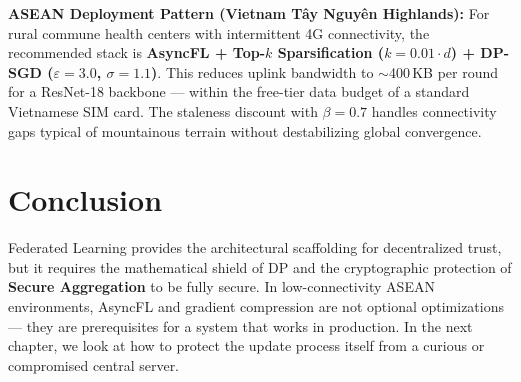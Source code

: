 \begin{svgraybox}
\textbf{ASEAN Deployment Pattern (Vietnam T\^ay Nguy\^en Highlands):} For rural commune health centers with intermittent 4G connectivity, the recommended stack is \textbf{AsyncFL + Top-$k$ Sparsification ($k{=}0.01{\cdot}d$) + DP-SGD ($\varepsilon{=}3.0$, $\sigma{=}1.1$)}. This reduces uplink bandwidth to $\sim$400\,KB per round for a ResNet-18 backbone --- within the free-tier data budget of a standard Vietnamese SIM card. The staleness discount with $\beta{=}0.7$ handles connectivity gaps typical of mountainous terrain without destabilizing global convergence.
\end{svgraybox}

\section{Conclusion}
\label{sec:conclusion_fl}

Federated Learning provides the architectural scaffolding for decentralized trust, but it requires the mathematical shield of DP and the cryptographic protection of \textbf{Secure Aggregation} to be fully secure. In low-connectivity ASEAN environments, AsyncFL and gradient compression are not optional optimizations --- they are prerequisites for a system that works in production. In the next chapter, we look at how to protect the update process itself from a curious or compromised central server.


